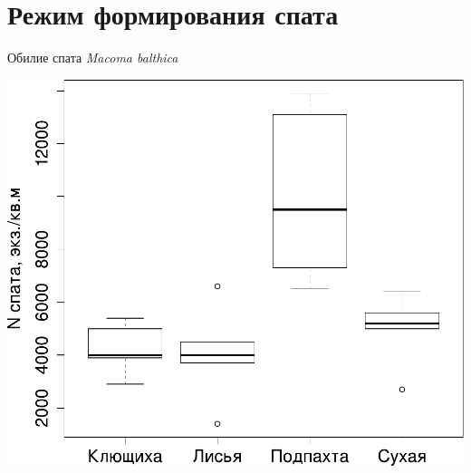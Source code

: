 \documentclass{beamer}
\begin{document}
		\section[Оседание]{Режим формирования спата}
\begin{frame}{Обилие спата \textit{Macoma balthica}}
		\begin{center}
			\includegraphics[width=\textwidth]{N_spat1.pdf}
		\end{center}
\end{frame}



\end{document}
